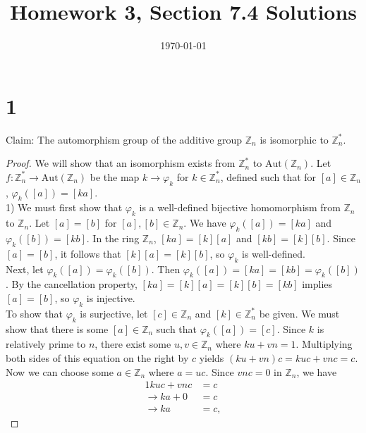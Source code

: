 \documentclass{article}
\title{\textbf{Homework 3, Section 7.4 Solutions}}
\date{}
\date\today
\begin{document}
\maketitle %

\thispagestyle{firstpage}
\section*{1}

Claim: The automorphism group of the additive group $\mathbb{Z}_n$ is isomorphic to $\mathbb{Z}_n^*$.

\begin{proof}
    We will show that an isomorphism exists from $\mathbb{Z}_n^*$ to $\mathrm{Aut}(\mathbb{Z}_n)$.  Let 
    $f:\mathbb{Z}_n^* \rightarrow \mathrm{Aut}(\mathbb{Z}_n)$ be the map $k \rightarrow \varphi_k$ for $k \in \mathbb{Z}_n^*$, defined such that  
    for $[a] \in \mathbb{Z}_n$, $\varphi_k([a]) = [ka]$.\\
    
    1) We must first show that $\varphi_k$ is 
    a well-defined bijective homomorphism from $\mathbb{Z}_n$ to $\mathbb{Z}_n$.  Let $[a] = [b]$ for 
    $[a], [b] \in \mathbb{Z}_n$.  We have $\varphi_k([a]) = [ka]$ and $\varphi_k([b]) = [kb]$.  
    In the ring $\mathbb{Z}_n$, $[ka] = [k][a]$ and $[kb] = [k][b]$.  Since 
    $[a] = [b]$, it follows that $[k][a] = [k][b]$, so $\varphi_k$ is well-defined.  \\ 

    Next, let $\varphi_k([a]) = \varphi_k([b])$.  Then $\varphi_k([a]) = [ka] = [kb] = \varphi_k([b])$.  
    By the cancellation property, $[ka] = [k][a] = [k][b] = [kb]$ implies $[a] = [b]$, so 
    $\varphi_k$ is injective.\\ 

    To show that $\varphi_k$ is surjective, let $[c] \in \mathbb{Z}_n$ and $[k] \in 
    \mathbb{Z}_n^*$ be given.  We must show that there is some $[a] \in \mathbb{Z}_n$ such that 
    $\varphi_k([a]) = [c]$.  Since $k$ is relatively prime to $n$, there exist some $u, v \in \mathbb{Z}_n$ 
    where $ku + vn = 1$.  Multiplying both sides of this equation on the right by $c$ yields $(ku + vn)c = kuc + vnc = c$.  
    Now we can choose some $a \in \mathbb{Z}_n$ where $a = uc$.  Since $vnc = 0$ in $\mathbb{Z}_n$, 
    we have  
    \begin{alignat*}{1}
        kuc + vnc &= c \\
    \rightarrow ka + 0 &= c \\
    \rightarrow ka &= c, \tag{1}\label{c} 
    \end{alignat*} 
        

\end{proof}
\end{document}
